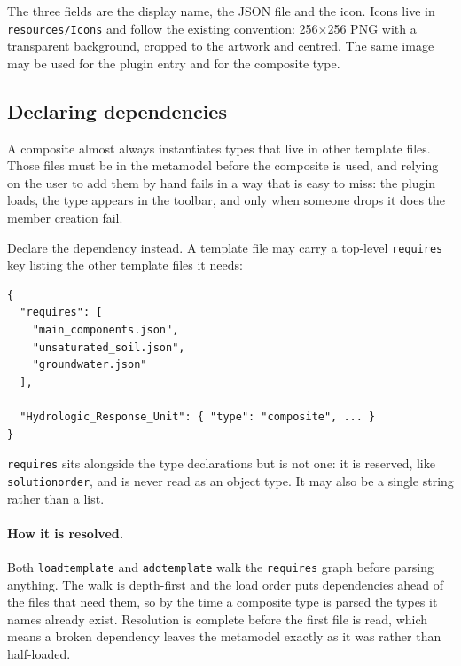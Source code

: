 \documentclass[11pt,a4paper]{article}
\newcommand{\code}[1]{\texttt{\small #1}}
\newcommand{\file}[1]{\texttt{\small #1}}
\newcommand{\ghtree}{https://github.com/ArashMassoudieh/OpenHydroQual/tree/master}
\newcommand{\exdir}[1]{\href{\ghtree/#1}{\file{#1}}}
\begin{document}
\noindent
The three fields are the display name, the JSON file and the icon. Icons live
in \exdir{resources/Icons} and follow the existing convention: 256$\times$256
PNG with a transparent background, cropped to the artwork and centred. The same
image may be used for the plugin entry and for the composite type.

\subsection{Declaring dependencies}\label{sec:requires}

A composite almost always instantiates types that live in other template files.
Those files must be in the metamodel before the composite is used, and relying
on the user to add them by hand fails in a way that is easy to miss: the plugin
loads, the type appears in the toolbar, and only when someone drops it does the
member creation fail.

Declare the dependency instead. A template file may carry a top-level
\code{requires} key listing the other template files it needs:

\begin{lstlisting}
{
  "requires": [
    "main_components.json",
    "unsaturated_soil.json",
    "groundwater.json"
  ],

  "Hydrologic_Response_Unit": { "type": "composite", ... }
}
\end{lstlisting}

\noindent
\code{requires} sits alongside the type declarations but is not one: it is
reserved, like \code{solutionorder}, and is never read as an object type. It may
also be a single string rather than a list.

\paragraph{How it is resolved.}
Both \code{loadtemplate} and \code{addtemplate} walk the \code{requires} graph
before parsing anything. The walk is depth-first and the load order puts
dependencies ahead of the files that need them, so by the time a composite type
is parsed the types it names already exist. Resolution is complete before the
first file is read, which means a broken dependency leaves the metamodel exactly
as it was rather than half-loaded.
\end{document}
